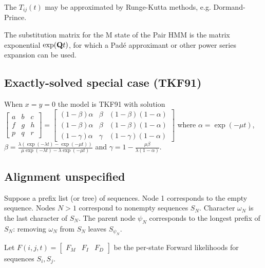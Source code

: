 \documentclass{article}
\begin{document}
The $T_{ij}(t)$ may be approximated by Runge-Kutta methods,
e.g. Dormand-Prince. %

The substitution matrix for the M state of the Pair HMM is
the matrix exponential $\exp({\bf Q}t)$, for which a Pad\'{e} approximant
or other power series expansion can be used. %

\subsection{Exactly-solved special case (TKF91)}

When $x=y=0$ the model is TKF91 \cite{ThorneEtAl91}
with solution
$
\begin{bmatrix}
a & b & c \\
f & g & h \\
p & q & r 
\end{bmatrix}
=
\begin{bmatrix}
(1-\beta)\alpha & \beta & (1-\beta)(1-\alpha) \\
(1-\beta)\alpha & \beta & (1-\beta)(1-\alpha) \\
(1-\gamma)\alpha & \gamma & (1-\gamma)(1-\alpha)
\end{bmatrix}
$
where
$\alpha = \exp(-\mu t)$,
$\beta = \frac{\lambda \left( \exp(-\lambda t) - \exp(-\mu t) \right)}{\mu \exp(-\lambda t) - \lambda \exp(-\mu t)}$
and
$\gamma = 1 - \frac{\mu \beta}{\lambda (1 - \alpha)}$.



\subsection{Alignment unspecified}

Suppose a prefix list (or tree) of sequences.
Node 1 corresponds to the empty sequence.
Nodes $N>1$ correspond to nonempty sequences $S_N$.
Character $\omega_N$ is the last character of $S_N$.
The parent node $\psi_N$ corresponds to the longest prefix of $S_N$:
removing $\omega_N$ from $S_N$ leaves $S_{\psi_N}$.

Let $F(i,j,t) = \begin{bmatrix} F_M & F_I & F_D \end{bmatrix}$
be the per-state Forward likelihoods for sequences $S_i,S_j$.
\end{document}
